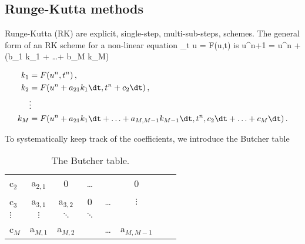 \documentclass[11pt]{article}
\begin{document}
\subsection{Runge-Kutta methods}
Runge-Kutta (RK) are explicit, single-step, multi-sub-steps, schemes. The general form of an RK scheme for a non-linear equation 
\beq
\label{eq:gov_eqn}
\p_t u = F(u,t)\com
\eeq
is
\beq
\label{eq:rk_general}
u^{n+1} = u^n + \dt \left(b_1 k_1 + \ldots + b_M k_M\right)
\eeq

\begin{align}
    \label{eq:rk_ks}
    k_1 &= F(u^n,t^n)\com \nonumber \\
k_2 &= F(u^n+a_{21}k_1\dt,t^n + c_2 \dt)\com \nonumber \\
    &\vdots \nonumber \\
    k_{M} &= F(u^n+a_{21}k_1\dt + \ldots + a_{M,M-1}k_{M-1}\dt,t^n , c_2 \dt + \ldots + c_M\dt)\per
\end{align}


To systematically keep track of the coefficients, we introduce the Butcher table
\begin{table}
\label{butcher_table}
\caption{The Butcher table.}
\centering
\begin{tabular}{l| c c c c c c c }
    c$_2$ & a$_{2,1}$ & 0 & \ldots & & 0 \\
    c$_3$ & a$_{3,1}$ & a$_{3,2}$ & 0 & \ldots & $\vdots$ \\
    $\vdots$ & $\vdots$ & $\ddots$ & $\ddots$  \\
    c$_M$ & a$_{M,1}$ & a$_{M,2}$ & &\ldots &a$_{M,M-1}$\\
\hline
\end{tabular}
\end{table}
\end{document}
